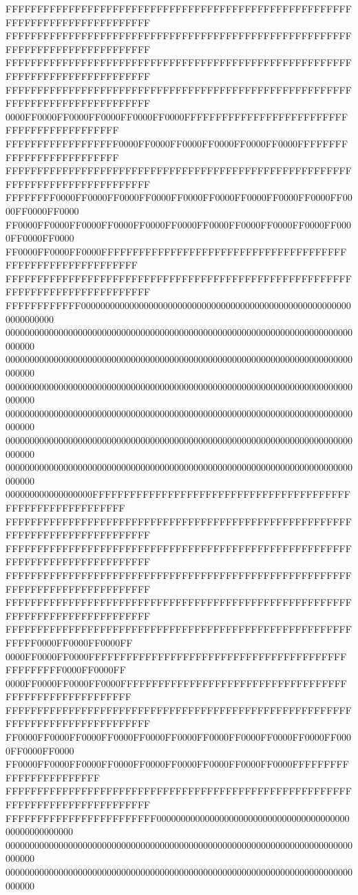 FFFFFFFFFFFFFFFFFFFFFFFFFFFFFFFFFFFFFFFFFFFFFFFFFFFFFFFFFFFFFFFFFFFFFFFFFFFFFF
FFFFFFFFFFFFFFFFFFFFFFFFFFFFFFFFFFFFFFFFFFFFFFFFFFFFFFFFFFFFFFFFFFFFFFFFFFFFFF
FFFFFFFFFFFFFFFFFFFFFFFFFFFFFFFFFFFFFFFFFFFFFFFFFFFFFFFFFFFFFFFFFFFFFFFFFFFFFF
FFFFFFFFFFFFFFFFFFFFFFFFFFFFFFFFFFFFFFFFFFFFFFFFFFFFFFFFFFFFFFFFFFFFFFFFFFFFFF
0000FF0000FF0000FF0000FF0000FF0000FFFFFFFFFFFFFFFFFFFFFFFFFFFFFFFFFFFFFFFFFFFF
FFFFFFFFFFFFFFFFFF0000FF0000FF0000FF0000FF0000FF0000FFFFFFFFFFFFFFFFFFFFFFFFFF
FFFFFFFFFFFFFFFFFFFFFFFFFFFFFFFFFFFFFFFFFFFFFFFFFFFFFFFFFFFFFFFFFFFFFFFFFFFFFF
FFFFFFFF0000FF0000FF0000FF0000FF0000FF0000FF0000FF0000FF0000FF0000FF0000FF0000
FF0000FF0000FF0000FF0000FF0000FF0000FF0000FF0000FF0000FF0000FF0000FF0000FF0000
FF0000FF0000FF0000FFFFFFFFFFFFFFFFFFFFFFFFFFFFFFFFFFFFFFFFFFFFFFFFFFFFFFFFFFFF
FFFFFFFFFFFFFFFFFFFFFFFFFFFFFFFFFFFFFFFFFFFFFFFFFFFFFFFFFFFFFFFFFFFFFFFFFFFFFF
FFFFFFFFFFFF000000000000000000000000000000000000000000000000000000000000000000
000000000000000000000000000000000000000000000000000000000000000000000000000000
000000000000000000000000000000000000000000000000000000000000000000000000000000
000000000000000000000000000000000000000000000000000000000000000000000000000000
000000000000000000000000000000000000000000000000000000000000000000000000000000
000000000000000000000000000000000000000000000000000000000000000000000000000000
000000000000000000000000000000000000000000000000000000000000000000000000000000
000000000000000000FFFFFFFFFFFFFFFFFFFFFFFFFFFFFFFFFFFFFFFFFFFFFFFFFFFFFFFFFFFF
FFFFFFFFFFFFFFFFFFFFFFFFFFFFFFFFFFFFFFFFFFFFFFFFFFFFFFFFFFFFFFFFFFFFFFFFFFFFFF
FFFFFFFFFFFFFFFFFFFFFFFFFFFFFFFFFFFFFFFFFFFFFFFFFFFFFFFFFFFFFFFFFFFFFFFFFFFFFF
FFFFFFFFFFFFFFFFFFFFFFFFFFFFFFFFFFFFFFFFFFFFFFFFFFFFFFFFFFFFFFFFFFFFFFFFFFFFFF
FFFFFFFFFFFFFFFFFFFFFFFFFFFFFFFFFFFFFFFFFFFFFFFFFFFFFFFFFFFFFFFFFFFFFFFFFFFFFF
FFFFFFFFFFFFFFFFFFFFFFFFFFFFFFFFFFFFFFFFFFFFFFFFFFFFFFFFFFFF0000FF0000FF0000FF
0000FF0000FF0000FFFFFFFFFFFFFFFFFFFFFFFFFFFFFFFFFFFFFFFFFFFFFFFFFF0000FF0000FF
0000FF0000FF0000FF0000FFFFFFFFFFFFFFFFFFFFFFFFFFFFFFFFFFFFFFFFFFFFFFFFFFFFFFFF
FFFFFFFFFFFFFFFFFFFFFFFFFFFFFFFFFFFFFFFFFFFFFFFFFFFFFFFFFFFFFFFFFFFFFFFFFFFFFF
FF0000FF0000FF0000FF0000FF0000FF0000FF0000FF0000FF0000FF0000FF0000FF0000FF0000
FF0000FF0000FF0000FF0000FF0000FF0000FF0000FF0000FF0000FFFFFFFFFFFFFFFFFFFFFFFF
FFFFFFFFFFFFFFFFFFFFFFFFFFFFFFFFFFFFFFFFFFFFFFFFFFFFFFFFFFFFFFFFFFFFFFFFFFFFFF
FFFFFFFFFFFFFFFFFFFFFFFF000000000000000000000000000000000000000000000000000000
000000000000000000000000000000000000000000000000000000000000000000000000000000
000000000000000000000000000000000000000000000000000000000000000000000000000000
